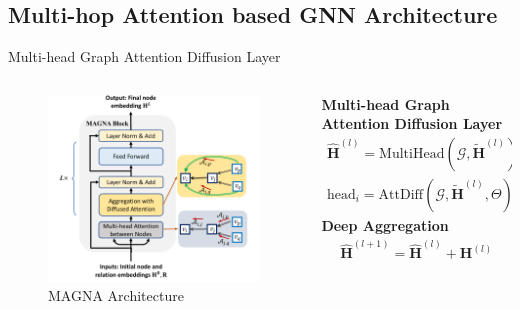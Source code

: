 \documentclass[notheorems, aspectratio=149]{beamer}
\begin{document}
		\subsection{Multi-hop Attention based GNN Architecture}
		\begin{frame}{Multi-head Graph Attention Diffusion Layer}
			\begin{columns}
				\begin{column}{0.4\textwidth}
					\begin{figure}[H]
						\centering
						\includegraphics[width=1\linewidth]{figs/magna_architecture.png}
						\caption{MAGNA Architecture}
						\label{fig:writing-thesis}
					\end{figure}
				\end{column}
				\begin{column}{0.6\textwidth}  %
					\textbf{Multi-head Graph Attention Diffusion Layer}
					\begin{gather*}
						\hat{\mathbf{H}}^{(l)} = \text{MultiHead}(\mathcal{G}, \widetilde{\mathbf{H}}^{(l)}) = \left(||_{i=1}^{M}\text{head}_i\right)\mathbf{W}_0 \\
						\text{head}_i = \text{AttDiff}(\mathcal{G}, \widetilde{\mathbf{H}}^{(l)}, \Theta), \widetilde{\mathbf{H}}^{(l)} = LN(\mathbf{H}^{(l)})
					\end{gather*}
					\textbf{Deep Aggregation}
					\begin{gather*}
						\hat{\mathbf{H}}^{(l+1)} = \hat{\mathbf{H}}^{(l)} + \mathbf{H}^{(l)}\\

\end{gather*}
\end{column}
\end{columns}
\end{frame}
\end{document}
